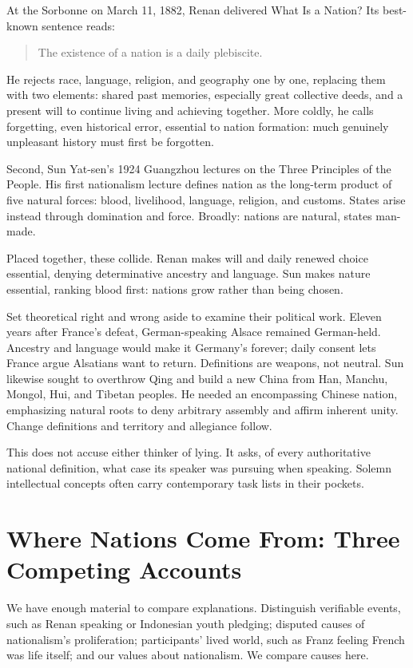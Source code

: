 At the Sorbonne on March 11, 1882, Renan delivered What Is a Nation? Its best-known sentence reads:

\begin{quote}
The existence of a nation is a daily plebiscite.
\end{quote}
He rejects race, language, religion, and geography one by one, replacing them with two elements: shared past memories, especially great collective deeds, and a present will to continue living and achieving together. More coldly, he calls forgetting, even historical error, essential to nation formation: much genuinely unpleasant history must first be forgotten.

Second, Sun Yat-sen's 1924 Guangzhou lectures on the Three Principles of the People. His first nationalism lecture defines nation as the long-term product of five natural forces: blood, livelihood, language, religion, and customs. States arise instead through domination and force. Broadly: nations are natural, states man-made.

Placed together, these collide. Renan makes will and daily renewed choice essential, denying determinative ancestry and language. Sun makes nature essential, ranking blood first: nations grow rather than being chosen.

Set theoretical right and wrong aside to examine their political work. Eleven years after France's defeat, German-speaking Alsace remained German-held. Ancestry and language would make it Germany's forever; daily consent lets France argue Alsatians want to return. Definitions are weapons, not neutral. Sun likewise sought to overthrow Qing and build a new China from Han, Manchu, Mongol, Hui, and Tibetan peoples. He needed an encompassing Chinese nation, emphasizing natural roots to deny arbitrary assembly and affirm inherent unity. Change definitions and territory and allegiance follow.

This does not accuse either thinker of lying. It asks, of every authoritative national definition, what case its speaker was pursuing when speaking. Solemn intellectual concepts often carry contemporary task lists in their pockets.

\section{Where Nations Come From: Three Competing Accounts}
We have enough material to compare explanations. Distinguish verifiable events, such as Renan speaking or Indonesian youth pledging; disputed causes of nationalism's proliferation; participants' lived world, such as Franz feeling French was life itself; and our values about nationalism. We compare causes here.

